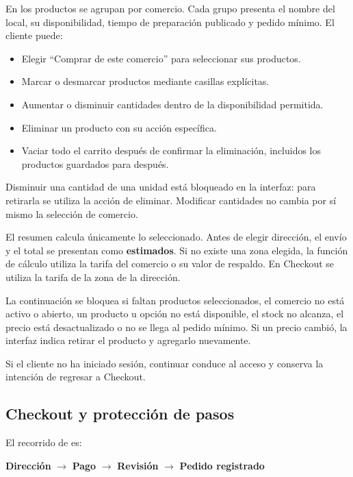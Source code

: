 \documentclass[12pt,letterpaper]{article}
\begin{document}
En  los productos se agrupan por comercio. Cada grupo presenta el nombre del local, su disponibilidad, tiempo de preparación publicado y pedido mínimo. El cliente puede:

\begin{itemize}
  \item Elegir ``Comprar de este comercio'' para seleccionar sus productos.
  \item Marcar o desmarcar productos mediante casillas explícitas.
  \item Aumentar o disminuir cantidades dentro de la disponibilidad permitida.
  \item Eliminar un producto con su acción específica.
  \item Vaciar todo el carrito después de confirmar la eliminación, incluidos los productos guardados para después.
\end{itemize}

Disminuir una cantidad de una unidad está bloqueado en la interfaz: para retirarla se utiliza la acción de eliminar. Modificar cantidades no cambia por sí mismo la selección de comercio.

El resumen calcula únicamente lo seleccionado. Antes de elegir dirección, el envío y el total se presentan como \textbf{estimados}. Si no existe una zona elegida, la función de cálculo utiliza la tarifa del comercio o su valor de respaldo. En Checkout se utiliza la tarifa de la zona de la dirección.

La continuación se bloquea si faltan productos seleccionados, el comercio no está activo o abierto, un producto u opción no está disponible, el stock no alcanza, el precio está desactualizado o no se llega al pedido mínimo. Si un precio cambió, la interfaz indica retirar el producto y agregarlo nuevamente.

Si el cliente no ha iniciado sesión, continuar conduce al acceso y conserva la intención de regresar a Checkout.

\subsection{Checkout y protección de pasos}

El recorrido de  es:

\begin{center}
\textbf{Dirección} $\longrightarrow$ \textbf{Pago} $\longrightarrow$ \textbf{Revisión} $\longrightarrow$ \textbf{Pedido registrado}
\end{center}
\end{document}
